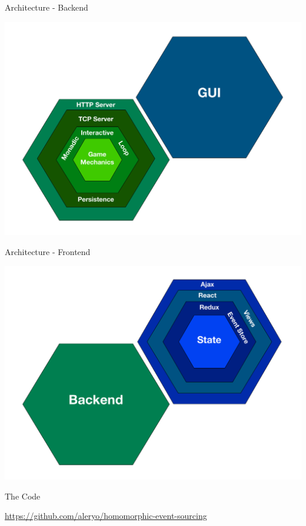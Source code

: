 \begin{frame}[fragile]{Architecture - Backend}
  \begin{center}
    \includegraphics[height=.8\textheight]{./images/archi-back.pdf}
  \end{center}
\end{frame}

\begin{frame}[fragile]{Architecture - Frontend}
  \begin{center}
    \includegraphics[height=.8\textheight]{./images/archi-front.pdf}
  \end{center}
\end{frame}

\begin{frame}[fragile]{The Code}
  \begin{center}
  \url{https://github.com/aleryo/homomorphic-event-sourcing}
  \end{center}
\end{frame}


